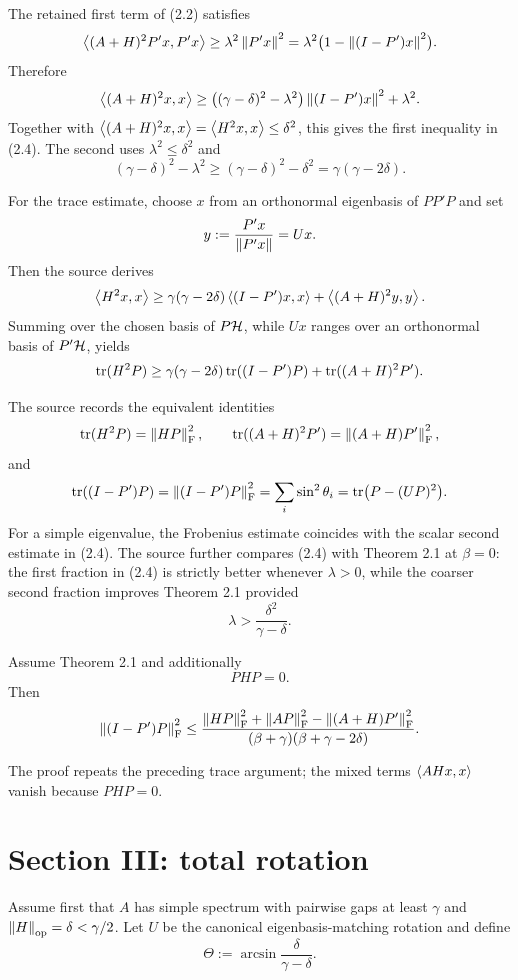 The retained first term of (2.2) satisfies
\[
  \left\langle (A+H)^2P'x,P'x\right\rangle
  \ge \lambda^2\left\lVert P'x\right\rVert^2
  =\lambda^2\bigl(1-\left\lVert (I-P')x\right\rVert^2\bigr).
\]
Therefore
\[
  \left\langle (A+H)^2x,x\right\rangle
  \ge
  \bigl((\gamma-\delta)^2-\lambda^2\bigr)
     \left\lVert (I-P')x\right\rVert^2+\lambda^2.
\]
Together with $\left\langle (A+H)^2x,x\right\rangle=\left\langle H^2x,x\right\rangle\le\delta^2$, this gives the first inequality in (2.4). The second uses $\lambda^2\le\delta^2$ and
\[
  (\gamma-\delta)^2-\lambda^2
  \ge(\gamma-\delta)^2-\delta^2
  =\gamma(\gamma-2\delta).
\]

For the trace estimate, choose $x$ from an orthonormal eigenbasis of $PP'P$ and set
\[
  y:=\frac{P'x}{\left\lVert P'x\right\rVert}=Ux.
\]
Then the source derives
\[
  \left\langle H^2x,x\right\rangle
  \ge
  \gamma(\gamma-2\delta)\left\langle (I-P')x,x\right\rangle
  +\left\langle (A+H)^2y,y\right\rangle.
\]
Summing over the chosen basis of $P\mathcal{H}$, while $Ux$ ranges over an orthonormal basis of $P'\mathcal{H}$, yields
\[
  \operatorname{tr}(H^2P)
  \ge
  \gamma(\gamma-2\delta)\operatorname{tr}((I-P')P)
  +\operatorname{tr}((A+H)^2P').
\]

The source records the equivalent identities
\[
  \operatorname{tr}(H^2P)=\left\lVert HP\right\rVert_{\mathrm{F}}^2,
  \qquad
  \operatorname{tr}((A+H)^2P')=\left\lVert (A+H)P'\right\rVert_{\mathrm{F}}^2,
\]
and
\[
  \operatorname{tr}((I-P')P)
  =\left\lVert (I-P')P\right\rVert_{\mathrm{F}}^2
  =\sum_i\sin^2\theta_i
  =\operatorname{tr}\bigl(P-(UP)^2\bigr).
\]
For a simple eigenvalue, the Frobenius estimate coincides with the scalar second estimate in (2.4). The source further compares (2.4) with Theorem 2.1 at $\beta=0$: the first fraction in (2.4) is strictly better whenever $\lambda>0$, while the coarser second fraction improves Theorem 2.1 provided
\[
  \lambda>\frac{\delta^2}{\gamma-\delta}.
\]

\begin{theorem}
Assume Theorem 2.1 and additionally
\[
  PHP=0.
\]
Then
\[
  \left\lVert (I-P')P\right\rVert_{\mathrm{F}}^2
  \le
  \frac{\left\lVert HP\right\rVert_{\mathrm{F}}^2+\left\lVert AP\right\rVert_{\mathrm{F}}^2-
        \left\lVert (A+H)P'\right\rVert_{\mathrm{F}}^2}
       {(\beta+\gamma)(\beta+\gamma-2\delta)}.
\]
\end{theorem}
The proof repeats the preceding trace argument; the mixed terms $\left\langle AHx,x\right\rangle$ vanish because $PHP=0$.

\section{Section III: total rotation}

Assume first that $A$ has simple spectrum with pairwise gaps at least $\gamma$ and $\left\lVert H\right\rVert_{\mathrm{op}}=\delta<\gamma/2$. Let $U$ be the canonical eigenbasis-matching rotation and define
\[
  \Theta:=\arcsin\frac{\delta}{\gamma-\delta}.
\]

